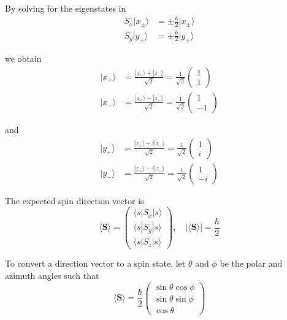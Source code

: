 By solving for the eigenstates in
\begin{align*}
S_x|x_\pm\rangle&=\pm\tfrac{\hbar}{2}|x_\pm\rangle
\\
S_y|y_\pm\rangle&=\pm\tfrac{\hbar}{2}|y_\pm\rangle
\end{align*}

we obtain
\begin{align*}
|x_+\rangle&=\frac{|z_+\rangle+|z_-\rangle}{\sqrt2}=\frac{1}{\sqrt2}\begin{pmatrix}1\\1\end{pmatrix}
\\
|x_-\rangle&=\frac{|z_+\rangle-|z_-\rangle}{\sqrt2}=\frac{1}{\sqrt2}\begin{pmatrix}1\\-1\end{pmatrix}
\end{align*}

and
\begin{align*}
|y_+\rangle&=\frac{|z_+\rangle+i|z_-\rangle}{\sqrt2}=\frac{1}{\sqrt2}\begin{pmatrix}1\\i\end{pmatrix}
\\
|y_-\rangle&=\frac{|z_+\rangle-i|z_-\rangle}{\sqrt2}=\frac{1}{\sqrt2}\begin{pmatrix}1\\-i\end{pmatrix}
\end{align*}

The expected spin direction vector is
\begin{equation*}
\langle\mathbf S\rangle=\begin{pmatrix}
\langle s|S_x|s\rangle\\
\langle s|S_y|s\rangle\\
\langle s|S_z|s\rangle
\end{pmatrix},\quad
|\langle\mathbf S\rangle|=\frac{\hbar}{2}
\end{equation*}

To convert a direction vector to a spin state, let $\theta$ and $\phi$
be the polar and azimuth angles such that
\begin{equation*}
\langle\mathbf S\rangle=\frac{\hbar}{2}\begin{pmatrix}
\sin\theta\cos\phi\\
\sin\theta\sin\phi\\
\cos\theta
\end{pmatrix}
\end{equation*}

